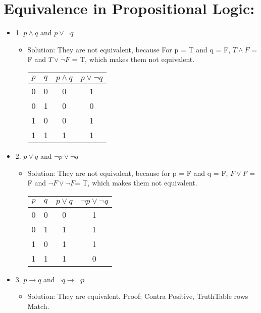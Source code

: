 \documentclass[11pt]{article}
\begin{document}
\section{Equivalence in Propositional Logic:}


\begin{itemize}
\item 1. $p  \wedge  q$ and $p  \vee  \neg q$ 

\begin{itemize}
\item Solution: They are not equivalent, because  For p = T and q = F, $T  \wedge F$ = F and $T \vee \neg F $ = T, which makes them not equivalent.

\begin{tabular}{|c|c|c|c|}
\hline
$p$ & $q$ & $p \land q$ & $p \lor  \lnot q$ \\
\hline
0 & 0 & 0 & 1 \\
0 & 1 & 0 & 0 \\
1 & 0 & 0 & 1 \\
1 & 1 & 1 & 1 \\
\hline
\end{tabular}

 \end{itemize} 

\item 2. $p \vee q$ and  $\neg p \vee  \neg q $

\begin{itemize}
\item Solution: They are not equivalent, because for p = F and q = F, $F \vee F$ = F and $\neg F \vee \neg F $= T, which makes them not equivalent.

\begin{tabular}{|c|c|c|c|}
\hline
$p$ & $q$ & $p \lor q$ & $ \lnot p \lor  \lnot q$ \\
\hline
0 & 0 & 0 & 1 \\
0 & 1 & 1 & 1 \\
1 & 0 & 1 & 1 \\
1 & 1 & 1 & 0 \\
\hline
\end{tabular}

 \end{itemize} 

\item 3. $p \to q$ and $ \neg q \to \neg p $

\begin{itemize}
\item Solution: They are equivalent. Proof: Contra Positive, TruthTable rows Match.


\end{itemize}
\end{itemize}
\end{document}
